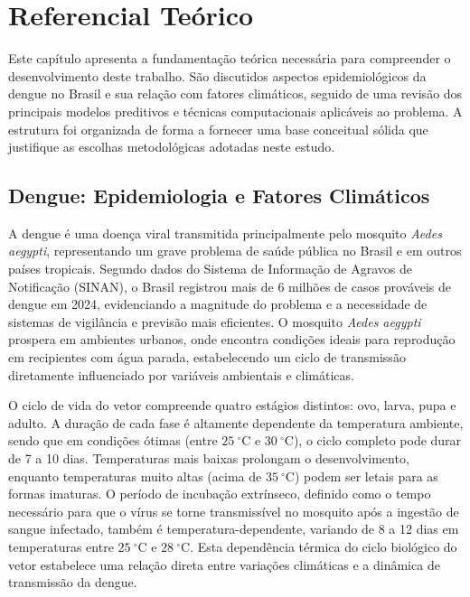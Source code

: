 \chapter{Referencial Teórico}

Este capítulo apresenta a fundamentação teórica necessária para compreender o desenvolvimento deste trabalho. São discutidos aspectos epidemiológicos da dengue no Brasil e sua relação com fatores climáticos, seguido de uma revisão dos principais modelos preditivos e técnicas computacionais aplicáveis ao problema. A estrutura foi organizada de forma a fornecer uma base conceitual sólida que justifique as escolhas metodológicas adotadas neste estudo.

\section{Dengue: Epidemiologia e Fatores Climáticos}

A dengue é uma doença viral transmitida principalmente pelo mosquito \textit{Aedes aegypti}, representando um grave problema de saúde pública no Brasil e em outros países tropicais. Segundo dados do Sistema de Informação de Agravos de Notificação (SINAN), o Brasil registrou mais de 6 milhões de casos prováveis de dengue em 2024, evidenciando a magnitude do problema e a necessidade de sistemas de vigilância e previsão mais eficientes. O mosquito \textit{Aedes aegypti} prospera em ambientes urbanos, onde encontra condições ideais para reprodução em recipientes com água parada, estabelecendo um ciclo de transmissão diretamente influenciado por variáveis ambientais e climáticas.

O ciclo de vida do vetor compreende quatro estágios distintos: ovo, larva, pupa e adulto. A duração de cada fase é altamente dependente da temperatura ambiente, sendo que em condições ótimas (entre $25~^\circ\mathrm{C}$  e $30~^\circ\mathrm{C}$), o ciclo completo pode durar de 7 a 10 dias. Temperaturas mais baixas prolongam o desenvolvimento, enquanto temperaturas muito altas (acima de $35~^\circ\mathrm{C}$) podem ser letais para as formas imaturas. O período de incubação extrínseco, definido como o tempo necessário para que o vírus se torne transmissível no mosquito após a ingestão de sangue infectado, também é temperatura-dependente, variando de 8 a 12 dias em temperaturas entre $25~^\circ\mathrm{C}$ e $28~^\circ\mathrm{C}$. Esta dependência térmica do ciclo biológico do vetor estabelece uma relação direta entre variações climáticas e a dinâmica de transmissão da dengue.

